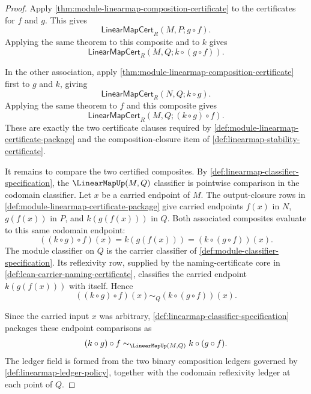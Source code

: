 \begin{proof}
Apply \autoref{thm:module-linearmap-composition-certificate} to the certificates for $f$ and $g$. This gives
$$
\mathsf{LinearMapCert}_R(M,P;g\circ f).
$$
Applying the same theorem to this composite and to $k$ gives
$$
\mathsf{LinearMapCert}_R(M,Q;k\circ(g\circ f)).
$$

In the other association, apply \autoref{thm:module-linearmap-composition-certificate} first to $g$ and $k$, giving
$$
\mathsf{LinearMapCert}_R(N,Q;k\circ g).
$$
Applying the same theorem to $f$ and this composite gives
$$
\mathsf{LinearMapCert}_R(M,Q;(k\circ g)\circ f).
$$
These are exactly the two certificate clauses required by \autoref{def:module-linearmap-certificate-package} and the composition-closure item of \autoref{def:linearmap-stability-certificate}.

It remains to compare the two certified composites. By \autoref{def:linearmap-classifier-specification}, the $\LinearMapUp(M,Q)$ classifier is pointwise comparison in the codomain classifier. Let $x$ be a carried endpoint of $M$. The output-closure rows in \autoref{def:module-linearmap-certificate-package} give carried endpoints $f(x)$ in $N$, $g(f(x))$ in $P$, and $k(g(f(x)))$ in $Q$. Both associated composites evaluate to this same codomain endpoint:
$$
((k\circ g)\circ f)(x)=k(g(f(x)))=(k\circ(g\circ f))(x).
$$
The module classifier on $Q$ is the carrier classifier of \autoref{def:module-classifier-specification}. Its reflexivity row, supplied by the naming-certificate core in \autoref{def:lean-carrier-naming-certificate}, classifies the carried endpoint $k(g(f(x)))$ with itself. Hence
$$
((k\circ g)\circ f)(x)\sim_Q(k\circ(g\circ f))(x).
$$

Since the carried input $x$ was arbitrary, \autoref{def:linearmap-classifier-specification} packages these endpoint comparisons as
$$
(k\circ g)\circ f\sim_{\LinearMapUp(M,Q)}k\circ(g\circ f).
$$
The ledger field is formed from the two binary composition ledgers governed by \autoref{def:linearmap-ledger-policy}, together with the codomain reflexivity ledger at each point of $Q$.
\end{proof}

